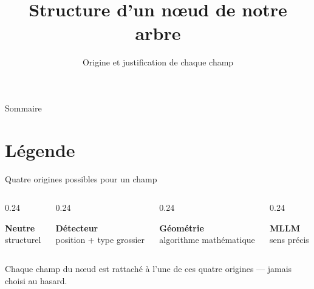\documentclass[11pt,aspectratio=169]{beamer}
\title{Structure d'un nœud de notre arbre}
\subtitle{Origine et justification de chaque champ}
\author{}
\date{}
\begin{document}
\maketitle

\begin{frame}{Sommaire}
  \tableofcontents
\end{frame}

\section{Légende}

\begin{frame}{Quatre origines possibles pour un champ}
  \begin{columns}[T,onlytextwidth]
    \begin{column}{0.24\textwidth}
      \begin{center}
      \colorbox{softgray!15}{\textcolor{softgray}{\textbf{\phantom{x}Neutre\phantom{x}}}}\\[4pt]
      \small structurel
      \end{center}
    \end{column}
    \begin{column}{0.24\textwidth}
      \begin{center}
      \colorbox{nodecoral!15}{\textcolor{nodecoral}{\textbf{\phantom{x}Détecteur\phantom{x}}}}\\[4pt]
      \small position + type grossier
      \end{center}
    \end{column}
    \begin{column}{0.24\textwidth}
      \begin{center}
      \colorbox{nodeteal!15}{\textcolor{nodeteal}{\textbf{\phantom{x}Géométrie\phantom{x}}}}\\[4pt]
      \small algorithme mathématique
      \end{center}
    \end{column}
    \begin{column}{0.24\textwidth}
      \begin{center}
      \colorbox{nodepurple!15}{\textcolor{nodepurple}{\textbf{\phantom{x}MLLM\phantom{x}}}}\\[4pt]
      \small sens précis
      \end{center}
    \end{column}
  \end{columns}
  \vspace{8mm}
  \begin{center}
  \small Chaque champ du nœud est rattaché à l'une de ces quatre origines --- jamais choisi au hasard.
  \end{center}
\end{frame}
\end{document}
